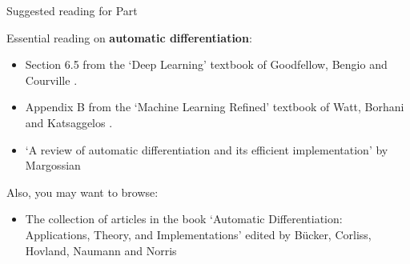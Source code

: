 %
%
%

\begin{frame}{Suggested reading for Part \thispart}

{
        \small
        Essential reading on {\bf automatic differentiation}:
        \begin{itemize}
            \scriptsize
            \item Section 6.5 from the `Deep Learning'
            textbook of Goodfellow, Bengio and Courville \cite{Goodfellow:2017MITDL}.
            \item Appendix B from the `Machine Learning Refined'
            textbook of Watt, Borhani and Katsaggelos \cite{Watt:2016Cambridge}.
            \item `A review of automatic differentiation and its
            efficient implementation' by Margossian \cite{Margossian:2019ad}
        \end{itemize}

        Also, you may want to browse:
        \begin{itemize}
            \scriptsize
            \item The collection of articles
             in the book `Automatic Differentiation: Applications, Theory, and Implementations'
             edited by B{\"u}cker, Corliss, Hovland, Naumann and Norris \cite{Bucker:2005ABo}
        \end{itemize}
}


\end{frame}
